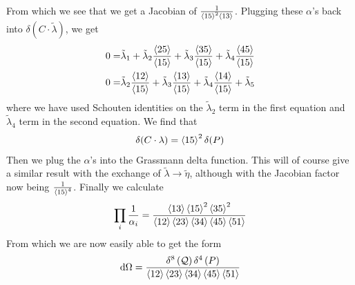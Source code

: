 \documentclass[letter,11pt]{article}
\begin{document}
From which we see that we get a Jacobian of $\frac{1}{\expval{15}^2\expval{13}}$. Plugging these $\alpha$'s back into $\delta (C\cdot\tilde \lambda)$, we get
\begin{equation}
	\begin{aligned}
0=&\tilde\lambda_1
+
\tilde\lambda_2 \frac{\expval{25}}{\expval{15}}
+
\tilde\lambda_3
\frac{\expval{35}}{\expval{15}}
+
\tilde\lambda_4
\frac{\expval{45}}{\expval{15}}\\
0=&\tilde\lambda_2 \frac{\expval{12}}{\expval{15}}
+
\tilde\lambda_3
\frac{\expval{13}}{\expval{15}}
+
\tilde\lambda_4 \frac{\expval{14}}{\expval{15}}
+
\tilde\lambda_5
\end{aligned}
\end{equation}
where we have used Schouten identities on the $\tilde\lambda_2$ term in the first equation and $\tilde \lambda_4$ term in the second equation. We find that
\begin{equation}
	\begin{aligned}
		\delta(C\cdot\lambda)=\expval{15}^2\delta (P)
	\end{aligned}
\end{equation}
Then we plug the $\alpha$'s into the Grassmann delta function. This will of course give a similar result with the exchange of $\tilde\lambda\to \tilde\eta$, although with the Jacobian factor now being $\frac{1}{\expval{15}^4}$. Finally we calculate
\begin{equation}
	\begin{aligned}
		\prod_i\frac{1}{\alpha_i}=\frac{\expval{13} \expval{15}^2 \expval{35}^2}{\expval{12}\expval{23}\expval{34}\expval{45}\expval{51}}
	\end{aligned}
\end{equation}
From which we are now easily able to get the form
\begin{equation}
	\begin{aligned}
		\dd \Omega =
		\frac{\delta^{8}\left(\mathcal{Q}\right)\delta^{4}\left(P\right)}{\expval{12}\expval{23}\expval{34}\expval{45}\expval{51}}
	\end{aligned}
\end{equation}
\end{document}
